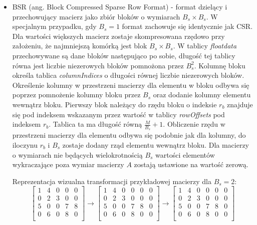 \begin{itemize}
    \item BSR (ang. Block Compressed Sparse Row Format) - format dzielący i przechowujący macierz jako zbiór bloków o wymiarach $B_s \times B_s$.
    W specjalnym przypadku, gdy $B_s = 1$ format zachowuje się identycznie jak CSR.
    Dla wartości większych macierz zostaje skompresowana rzędowo przy założeniu, że najmniejszą komórką jest blok $B_s \times B_s$.
    W tablicy \textit{floatdata} przechowywane są dane bloków następująco po sobie, długość tej tablicy równa jest liczbie niezerowych bloków pomnożona przez $B_s ^ 2$.
    Kolumnę bloku określa tablica \textit{columnIndices} o długości równej liczbie niezerowych bloków.
    Określenie kolumny w przestrzeni macierzy dla elementu w bloku odbywa się poprzez pomnożenie kolumny bloku przez $B_s$ oraz dodanie kolumny elementu wewnątrz bloku.
    Pierwszy blok należący do rzędu bloku o indeksie $r_b$ znajduje się pod indeksem wskazanym przez wartość w tablicy \textit{rowOffsets} pod indeksem $r_b$.
    Tablica ta ma długość równą $\frac{M}{B_s} + 1$.
    Obliczenie rzędu w przestrzeni macierzy dla elementu odbywa się podobnie jak dla kolumny, do iloczynu $r_b$ i $B_s$ zostaje dodany rząd elementu wewnątrz bloku. 
    Dla macierzy o wymiarach nie będących wielokrotnością $B_s$ wartości elementów wykraczające poza wymiar macierzy $A$ zostają ustawione na wartość zerową.

    Reprezentacja wizualna transformacji przykładowej macierzy dla $B_s = 2$:
    \[
\left[
\begin{array}{cccccc}
    1 & 4 & 0 & 0 & 0\\ 
    0 & 2 & 3 & 0 & 0\\ 
    5 & 0 & 0 & 7 & 8\\ 
    0 & 6 & 0 & 8 & 0\\ 
\end{array}
\right]
\rightarrow
\left[
\begin{array}{cccccc}
    1 & 4 & 0 & 0 & 0 & 0 \\ 
    0 & 2 & 3 & 0 & 0 & 0 \\ 
    5 & 0 & 0 & 7 & 8 & 0 \\ 
    0 & 6 & 0 & 8 & 0 & 0 \\ 
\end{array}
\right]
\rightarrow
\left[
\begin{array}{cc|cc|cc}
    1 & 4 & 0 & 0 & 0 & 0 \\ 
    0 & 2 & 3 & 0 & 0 & 0 \\ 
    \hline
    5 & 0 & 0 & 7 & 8 & 0 \\ 
    0 & 6 & 0 & 8 & 0 & 0 \\ 
\end{array}
\right]
\]


\end{itemize}
